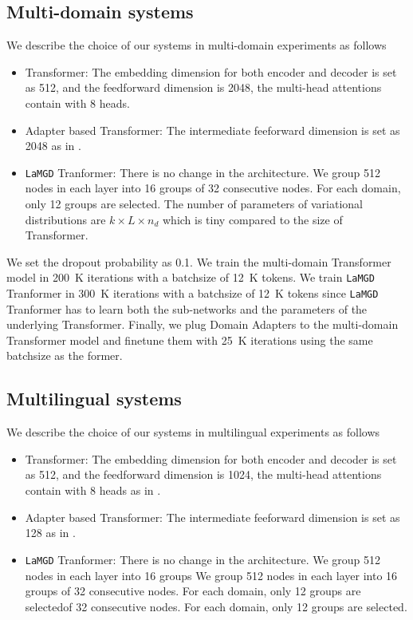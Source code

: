 \documentclass[11pt]{article}
\newcommand{\system}[1]{\texttt{{#1}}}
\begin{document}
\subsection{Multi-domain systems}
We describe the choice of our systems in multi-domain experiments as follows
\begin{itemize}
	\item Transformer: The embedding dimension for both encoder and decoder is set as 512, and the feedforward dimension is 2048, the multi-head attentions contain with 8 heads.
	\item Adapter based Transformer: The intermediate feeforward dimension is set as 2048 as in \citet{Pham21revisiting}.
	\item \system{LaMGD} Tranformer: There is no change in the architecture. We group 512 nodes in each layer into 16 groups of 32 consecutive nodes. For each domain, only 12 groups are selected. The number of parameters of variational distributions are $k \times L \times n_d$ which is tiny compared to the size of Transformer.
\end{itemize}

We set the dropout probability as 0.1. We train the multi-domain Transformer model in 200~K iterations with a batchsize of 12~K tokens. We train \system{LaMGD} Tranformer in 300~K iterations with a batchsize of 12~K tokens since \system{LaMGD} Tranformer has to learn both the sub-networks and the parameters of the underlying Transformer. Finally, we plug Domain Adapters to the multi-domain Transformer model and finetune them with 25~K iterations using the same batchsize as the former.
\subsection{Multilingual systems}
We describe the choice of our systems in multilingual experiments as follows
\begin{itemize}
	\item Transformer: The embedding dimension for both encoder and decoder is set as 512, and the feedforward dimension is 1024, the multi-head attentions contain with 8 heads as in \citet{Wang20balancing}.
	\item Adapter based Transformer: The intermediate feeforward dimension is set as 128 as in \citet{Gong21adaptive}.
	\item \system{LaMGD} Tranformer: There is no change in the architecture. We group 512 nodes in each layer into 16 groups We group 512 nodes in each layer into 16 groups of 32 consecutive nodes. For each domain, only 12 groups are selectedof 32 consecutive nodes. For each domain, only 12 groups are selected. 
\end{itemize}
\end{document}
